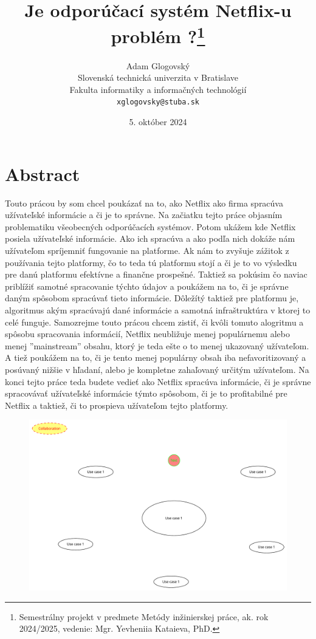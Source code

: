 \documentclass[10pt,twocolumn,twoside,slovak,a4paper]{article}
\title{Je odporúčací systém Netflix-u problém ?\thanks{Semestrálny projekt v predmete Metódy inžinierskej práce, ak. rok 2024/2025, vedenie: Mgr. Yevheniia Kataieva, PhD.}}
\author{Adam Glogovský\\[2pt]
	{\small Slovenská technická univerzita v Bratislave}\\
	{\small Fakulta informatiky a informačných technológií}\\
	{\small \texttt{xglogovsky@stuba.sk}}}
\date{\small 5. október 2024}
\begin{document}
\maketitle

\section*{Abstract}
Touto prácou by som chcel poukázať na to, ako Netflix ako firma spracúva užívateľské informácie a či je to správne. Na začiatku tejto práce objasním problematiku všeobecných odporúčacích systémov. Potom ukážem kde Netflix posiela užívateľské informácie. Ako ich spracúva a ako podľa nich dokáže nám užívateľom spríjemniť fungovanie na platforme. Ak nám to zvyšuje zážitok z používania tejto platformy, čo to teda tú platformu stojí a či je to vo výsledku pre danú platformu efektívne a finančne prospešné. Taktiež sa pokúsim čo naviac priblížiť samotné spracovanie týchto údajov a poukážem na to, či je správne daným spôsobom spracúvať tieto informácie.\cite{amatriain2015recommender} Dôležítý taktiež pre platformu je, algoritmus akým spracúvajú dané informácie a samotná infraštruktúra v ktorej to celé funguje. Samozrejme touto prácou chcem zistiť, či kvôli tomuto alogritmu a spôsobu spracovania informácií, Netflix neubližuje menej populárnemu alebo menej ''mainstream'' obsahu, ktorý je teda ešte o to menej ukazovaný užívateľom. A tiež poukážem na to, či je tento menej populárny obsah iba nefavoritizovaný a posúvaný nižšie v hľadaní, alebo je kompletne zahaľovaný určitým užívateľom. Na konci tejto práce teda budete vedieť ako Netflix spracúva informácie, či je správne spracovávať užívateľské informácie týmto spôsobom, či je to profitabilné pre Netflix a taktiež, či to prospieva užívateľom tejto platformy.


\newpage

\begin{figure}[h]
	\includegraphics[scale=0.25]{diagram.pdf}
\end{figure}



\newpage




\end{document}

